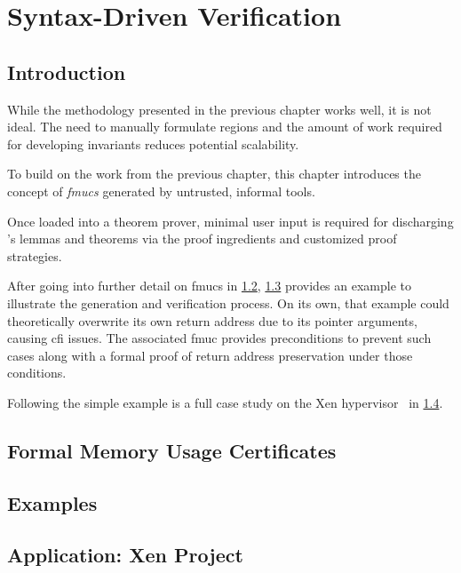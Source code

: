 \chapter{Syntax-Driven Verification} %
\section{Introduction}
While the methodology presented in the previous chapter works well, it is not ideal.
The need to manually formulate regions
and the amount of work required for developing invariants reduces potential scalability.

To build on the work from the previous chapter,
this chapter introduces the concept of \emph{\acp{fmuc}}
generated by untrusted, informal tools.

Once loaded into a theorem prover,
minimal user input is required for discharging 's lemmas and theorems
via the proof ingredients and customized proof strategies.

After going into further detail on \acp{fmuc} in \cref{se:fmuc},
\cref{se:syntax_example} provides an example to illustrate the generation
and verification process.
On its own, that example could theoretically overwrite its own return address
due to its pointer arguments, causing \ac{cfi} issues.
The associated \ac{fmuc} provides preconditions to prevent such cases
along with a formal proof of return address preservation under those conditions. 

Following the simple example is a full case study
on the Xen hypervisor~\citep{chisnall2008definitive} in \cref{se:xen}.

\section{Formal Memory Usage Certificates}\label{se:fmuc}
\section{Examples}\label{se:syntax_example}
\section{Application: Xen Project}\label{se:xen}
